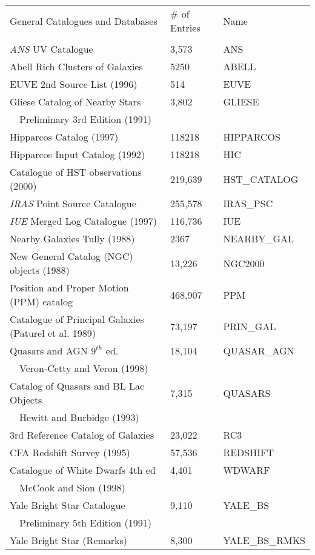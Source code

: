 \begin{tabular}{lll}
 General Catalogues and Databases & \# of Entries & Name       \\
         &          &        \\

 {\em ANS} UV Catalogue & 3,573 & ANS                    \\
 Abell Rich Clusters of Galaxies & 5250 & ABELL  \\
 EUVE 2nd Source List (1996) & 514 & EUVE \\
 Gliese Catalog of Nearby Stars & 3,802 & GLIESE \\
 ~~Preliminary 3rd Edition (1991) & & \\
  Hipparcos Catalog (1997) & 118218 & HIPPARCOS \\
 Hipparcos Input Catalog (1992) & 118218 & HIC \\
 Catalogue of HST observations (2000) & 219,639 & HST\_CATALOG \\
 {\em IRAS} Point Source Catalogue & 255,578 & IRAS\_PSC \\
 {\em IUE} Merged Log Catalogue (1997) & 116,736 & IUE           \\ 
 Nearby Galaxies Tully (1988) & 2367 & NEARBY\_GAL  \\
 New General Catalog (NGC) objects (1988) & 13,226 & NGC2000 \\
 Position and Proper Motion (PPM) catalog & 468,907 & PPM \\
 Catalogue of Principal Galaxies (Paturel et al. 1989) & 73,197 & PRIN\_GAL \\
 Quasars and AGN $9^{th}$ ed. & 18,104 & QUASAR\_AGN \\
 ~~Veron-Cetty and Veron (1998) & & \\
 Catalog of Quasars and BL Lac Objects & 7,315 & QUASARS \\
 ~~Hewitt and Burbidge (1993) \\
 3rd Reference Catalog of Galaxies  & 23,022 & RC3 \\
  CFA Redshift Survey (1995) & 57,536 & REDSHIFT            \\
  Catalogue of White Dwarfs 4th ed   & 4,401 & WDWARF \\
 ~~McCook and Sion (1998) & & \\
 Yale Bright Star Catalogue & 9,110 & YALE\_BS        \\  
 ~~Preliminary 5th Edition (1991) & & \\
 Yale Bright Star (Remarks) & 8,300 & YALE\_BS\_RMKS    \\

\end{tabular}
                                                      
                                        

